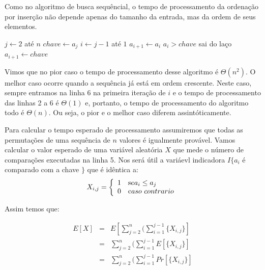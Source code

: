 \begin{example}

  Como no algoritmo de busca sequêncial, o tempo de processamento da ordenação por inserção não depende apenas do tamanho da entrada, mas da ordem de seus elementos.
  
   \begin{codebox}
     \li \For $j \gets 2$ até $n$
     \li \Do $chave \gets a_j$
     \li    \For $i \gets j-1$ até $1$
     \li    \Do $a_{i+1} \gets a_i$
     \li       \If $a_i > chave$
     \li       \Then sai do laço
               \End
            \End
     \li    $a_{i+1} \gets chave$
     \End
   \end{codebox}
   
   Vimos que no pior caso o tempo de processamento desse algoritmo é $\Theta(n^2)$.
   O melhor caso ocorre quando a sequência já está em ordem crescente.
   Neste caso, sempre entramos na linha 6 na primeira iteração de $i$ e o tempo de processamento das linhas 2 a 6 é $\Theta(1)$ e, portanto, o tempo de processamento do algoritmo todo é $\Theta(n)$.
   Ou seja, o pior e o melhor caso diferem assintóticamente.

   Para calcular o tempo esperado de processamento assumiremos que todas as permutações de uma sequência de $n$ valores é igualmente provável.
   Vamos calcular o valor esperado de uma variável aleatória $X$ que mede o número de comparações executadas na linha 5.
   Nos será útil a variáevl indicadora $I\{a_i$ é comparado com a chave $\}$ que é idêntica a:
   \begin{displaymath}
     X_{i,j} = \left\{ \begin{array}{cl}
                   1 & {\textrm se } a_i \leq a_j\\
                   0 & {\textrm caso\ contrario}
                   \end{array}\right.
   \end{displaymath}   

   Assim temos que:
   
   \begin{eqnarray*}
     E[X] & = & E\left[\sum_{j=2}^n(\sum_{i=1}^{j-1}\{X_{i,j}\}\right] \\
     & = & \sum_{j=2}^n(\sum_{i=1}^{j-1}E[\{X_{i,j}\}] \\
     & = & \sum_{j=2}^n(\sum_{i=1}^{j-1}Pr[\{X_{i,j}\}] \\
   \end{eqnarray*}


\end{example}
